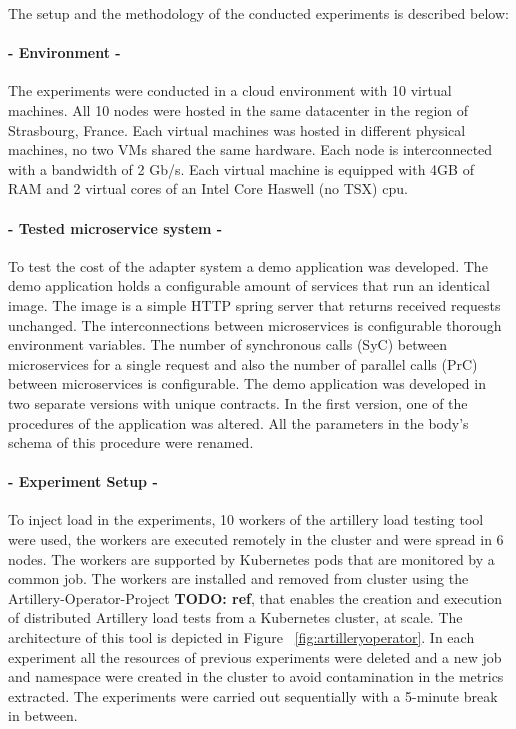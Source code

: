 The setup and the methodology of the conducted experiments is described below:

\paragraph{- Environment -}

The experiments were conducted in a cloud environment with 10 virtual machines.
All 10 nodes were hosted in the same datacenter in the region of Strasbourg, France.
Each virtual machines was hosted in different physical machines, no two VMs shared the same hardware.
Each node is interconnected with a bandwidth of 2 Gb/s.
Each virtual machine is equipped with 4GB of RAM and 2 virtual cores of an Intel Core Haswell (no TSX) cpu.

\paragraph{- Tested microservice system -}

To test the cost of the adapter system a demo application was developed.
The demo application holds a configurable amount of services that run an identical image.
The image is a simple HTTP spring server that returns received requests unchanged.
The interconnections between microservices is configurable thorough environment variables.
The number of synchronous calls (SyC) between microservices for a single request and also the number of parallel calls (PrC) between microservices is configurable.
The demo application was developed in two separate versions with unique contracts.
In the first version, one of the procedures of the application was altered.
All the parameters in the body's schema of this procedure were renamed.

\paragraph{- Experiment Setup -}

To inject load in the experiments, 10 workers of the artillery load testing tool were used,
the workers are executed remotely in the cluster and were spread in 6 nodes.
The workers are supported by Kubernetes pods that are monitored by a common job.
The workers are installed and removed from cluster using the Artillery-Operator-Project \textbf{TODO: ref}, that enables
the creation and execution of distributed Artillery load tests from a Kubernetes cluster, at scale.
The architecture of this tool is depicted in Figure ~\ref{fig:artilleryoperator}.
In each experiment all the resources of previous experiments were deleted and a new job and namespace were created in the
cluster to avoid contamination in the metrics extracted.
The experiments were carried out sequentially with a 5-minute break in between.

